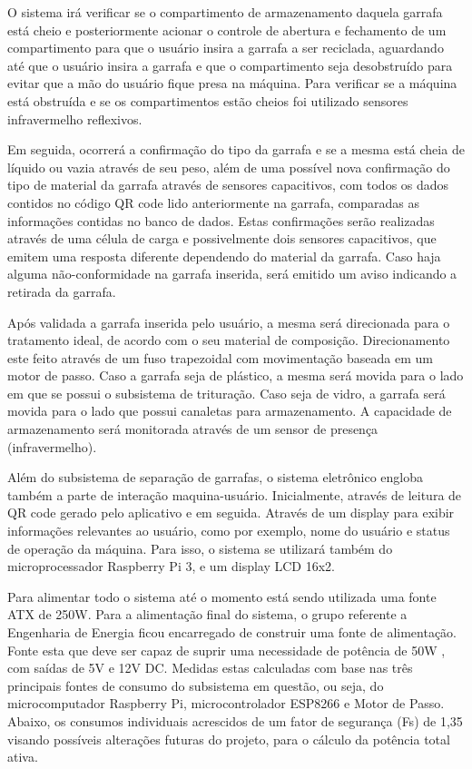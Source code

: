 O sistema irá verificar se o compartimento de armazenamento daquela garrafa está cheio e posteriormente acionar o controle de abertura e fechamento de um compartimento para que o usuário insira a garrafa a ser reciclada, aguardando até que o usuário insira a garrafa e que o compartimento seja desobstruído para evitar que a mão do usuário fique presa na máquina. Para verificar se a máquina está obstruída e se os compartimentos estão cheios foi utilizado sensores infravermelho reflexivos. 
 
Em seguida, ocorrerá a confirmação do tipo da garrafa e se a mesma está cheia de líquido ou vazia através de seu peso, além de uma possível nova confirmação do tipo de material da garrafa através de sensores capacitivos, com todos os dados contidos no código QR code lido anteriormente na garrafa, comparadas as informações contidas no banco de dados.  Estas confirmações serão realizadas através de uma célula de carga e possivelmente dois sensores capacitivos, que emitem uma resposta diferente dependendo do material da garrafa. Caso haja alguma não-conformidade na garrafa inserida, será emitido um aviso indicando a retirada da garrafa.
 
Após validada a garrafa inserida pelo usuário, a mesma será direcionada para o tratamento ideal, de acordo com o seu material de composição. Direcionamento este feito através de um fuso trapezoidal com movimentação baseada em um motor de passo. Caso a garrafa seja de plástico, a mesma será movida para o lado em que se possui o subsistema de trituração. Caso seja de vidro, a garrafa será movida para o lado que possui canaletas para armazenamento.  A capacidade de armazenamento será monitorada através de um sensor de presença (infravermelho).
 
Além do subsistema de separação de garrafas, o sistema eletrônico engloba também a parte de interação maquina-usuário. Inicialmente, através de leitura de QR code gerado pelo aplicativo e em seguida. Através de um display para exibir informações relevantes ao usuário, como por exemplo, nome do usuário e status de operação da máquina. Para isso, o sistema se utilizará também do microprocessador Raspberry Pi 3, e um display LCD 16x2.

Para alimentar todo o sistema até o momento está sendo utilizada uma fonte ATX de 250W. Para a alimentação final do sistema, o grupo referente a Engenharia de Energia ficou encarregado de construir uma fonte de alimentação. Fonte esta que deve ser capaz de suprir uma necessidade de potência de 50W , com saídas de 5V e 12V DC.
Medidas estas calculadas com base nas três principais fontes de consumo do subsistema em questão, ou seja, do microcomputador Raspberry Pi, microcontrolador ESP8266 e Motor de Passo. Abaixo, os consumos individuais acrescidos de um fator de segurança (Fs) de 1,35 visando possíveis alterações futuras do projeto, para o cálculo da potência total ativa.

